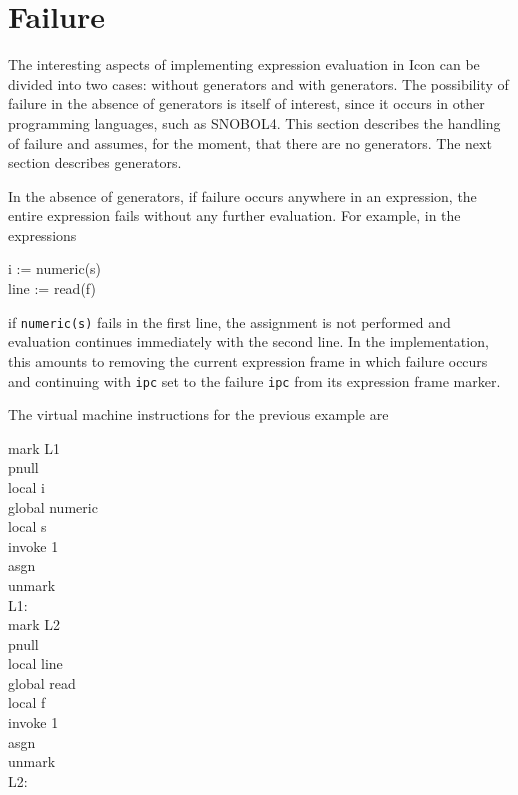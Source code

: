 \section{Failure}

The interesting aspects of implementing expression evaluation in Icon
can be divided into two cases: without generators and with
generators. The possibility of failure in the absence of generators is
itself of interest, since it occurs in other programming languages,
such as SNOBOL4. This section describes the handling of failure and
assumes, for the moment, that there are no generators. The next
section describes generators.

In the absence of generators, if failure occurs anywhere in an
expression, the entire expression fails without any further
evaluation. For example, in the expressions

\begin{iconcode}
\>i := numeric(s)\\
\>line := read(f)
\end{iconcode}


\noindent if \texttt{numeric(s)} fails in the first line, the
assignment is not performed and evaluation continues immediately with
the second line. In the implementation, this amounts to removing the
current expression frame in which failure occurs and continuing with
\texttt{ipc} set to the failure \texttt{ipc} from its expression frame
marker.

The virtual machine instructions for the previous example are

\begin{iconcode}
\>mark L1\\
\>pnull\\
\>local i\\
\>global numeric\\
\>local s\\
\>invoke 1\\
\>asgn\\
\>unmark\\
L1:\\
\>mark L2\\
\>pnull\\
\>local line\\
\>global read\\
\>local f\\
\>invoke 1\\
\>asgn\\
\>unmark\\
L2:
\end{iconcode}


